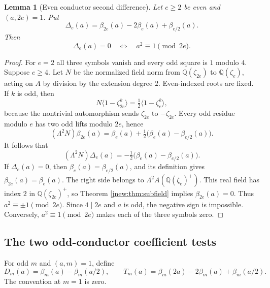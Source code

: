 \documentclass[11pt,a4paper]{article}
\newtheorem{lemma}[theorem]{Lemma}
\theoremstyle{definition}
\theoremstyle{remark}
\numberwithin{equation}{section}
\begin{document}
\begin{lemma}[Even conductor second difference]\label{jnew:lem:even-difference}
Let $e\ge2$ be even and $(a,2e)=1$. Put
\[
 \Delta_e(a)=\beta_{2e}(a)-2\beta_e(a)+\beta_{e/2}(a).
\]
Then
\begin{equation}\label{jnew:eq:Delta-zero}
 \Delta_e(a)=0
 \quad\Longleftrightarrow\quad a^2\equiv1\pmod{2e}.
\end{equation}
\end{lemma}
\begin{proof}
For $e=2$ all three symbols vanish and every odd square is $1$
modulo $4$. Suppose $e\ge4$. Let $N$ be the normalized field norm
from $\mathbb Q(\zeta_{2e})$ to $\mathbb Q(\zeta_e)$, acting on
$A$ by division by the extension degree $2$. Even-indexed roots
are fixed. If $k$ is odd, then
\[
 N\langle1-\zeta_{2e}^k\rangle
 =\tfrac12\langle1-\zeta_e^k\rangle,
\]
because the nontrivial automorphism sends $\zeta_{2e}$ to
$-\zeta_{2e}$. Every odd residue modulo $e$ has two odd lifts
modulo $2e$, hence
\begin{equation}\label{jnew:eq:dyadic-norm}
 (\Lambda^2N)\beta_{2e}(a)
 =\beta_e(a)+\tfrac12\bigl(\beta_e(a)-\beta_{e/2}(a)\bigr).
\end{equation}
It follows that
\[
 (\Lambda^2N)\Delta_e(a)
 =-\tfrac12\bigl(\beta_e(a)-\beta_{e/2}(a)\bigr).
\]
If $\Delta_e(a)=0$, then $\beta_e(a)=\beta_{e/2}(a)$, and its
definition gives $\beta_{2e}(a)=\beta_e(a)$. The right side belongs
to $\Lambda^2 A(\mathbb Q(\zeta_e)^+)$. This real field has index
$2$ in $\mathbb Q(\zeta_{2e})^+$, so Theorem
\ref{jnew:thm:subfield} implies $\beta_{2e}(a)=0$.
Thus $a^2\equiv\pm1\pmod{2e}$. Since $4\mid2e$ and $a$ is odd,
the negative sign is impossible. Conversely,
$a^2\equiv1\pmod{2e}$ makes each of the three symbols zero.
\end{proof}

\subsection{The two odd-conductor coefficient tests}

For odd $m$ and $(a,m)=1$, define
\[
 D_m(a)=\beta_m(a)-\beta_m(a/2),\qquad
 T_m(a)=\beta_m(2a)-2\beta_m(a)+\beta_m(a/2).
\]
The convention at $m=1$ is zero.
\end{document}
